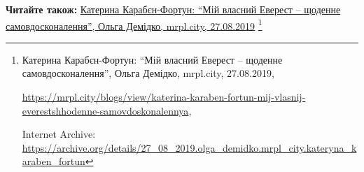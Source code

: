  
 
 
 
 

\def\pubIA{https://archive.org/details/27_08_2019.olga_demidko.mrpl_city.kateryna_karaben_fortun}
\def\pubTitle{Катерина Карабєн-Фортун: \enquote{Мій власний Еверест – щоденне самовдосконалення}}
\def\pubDate{27.08.2019}
\def\pubOrigin{https://mrpl.city/blogs/view/katerina-karaben-fortun-mij-vlasnij-everestshhodenne-samovdoskonalennya}
\def\pubAuthor{Ольга Демідко}

\textbf{Читайте також:} \href{\pubIA}{%
\pubTitle, \pubAuthor, mrpl.city, \pubDate}%
\footnote{\pubTitle, \pubAuthor, mrpl.city, \pubDate, \par\url{\pubOrigin}, \par Internet Archive: \url{\pubIA}}
